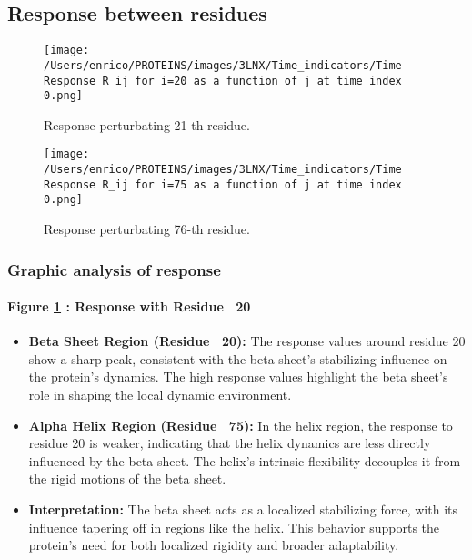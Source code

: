 \documentclass[English, Lau, oneside]{sapthesis}
\begin{document}
\newpage
\newpage









\subsection{Response between residues}
\begin{figure}[h!]
    \centering
    \texttt{[image: /Users/enrico/PROTEINS/images/3LNX/Time\_indicators/Time Response R\_ij for i=20 as a function of j at time index 0.png]}
    \caption{Response perturbating 21-th residue.}
    \label{fig:resp21}
\end{figure}


\begin{figure}[h!]
    \centering
    \texttt{[image: /Users/enrico/PROTEINS/images/3LNX/Time\_indicators/Time Response R\_ij for i=75 as a function of j at time index 0.png]}
    \caption{Response perturbating 76-th residue.}
    \label{fig:resp76}
\end{figure}
\subsubsection{Graphic analysis of response}
\paragraph{Figure \ref{fig:resp21} : Response with Residue ~20}
\begin{itemize}
    \item \textbf{Beta Sheet Region (Residue ~20):} The response values around residue 20 show a sharp peak, consistent with the beta sheet's stabilizing influence on the protein's dynamics. The high response values highlight the beta sheet’s role in shaping the local dynamic environment.
    \item \textbf{Alpha Helix Region (Residue ~75):} In the helix region, the response to residue 20 is weaker, indicating that the helix dynamics are less directly influenced by the beta sheet. The helix's intrinsic flexibility decouples it from the rigid motions of the beta sheet.
    \item \textbf{Interpretation:} The beta sheet acts as a localized stabilizing force, with its influence tapering off in regions like the helix. This behavior supports the protein's need for both localized rigidity and broader adaptability.
\end{itemize}
\end{document}
